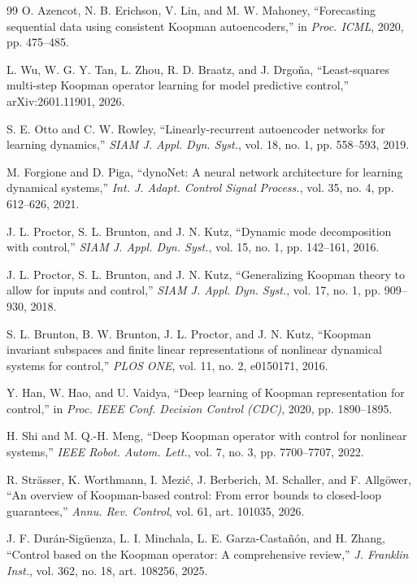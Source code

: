 \documentclass[journal]{IEEEtran}
\begin{document}
\begin{thebibliography}{99}
O. Azencot, N. B. Erichson, V. Lin, and M. W. Mahoney, ``Forecasting sequential data using consistent Koopman autoencoders,'' in \emph{Proc. ICML}, 2020, pp. 475--485.

L. Wu, W. G. Y. Tan, L. Zhou, R. D. Braatz, and J. Drgo\v{n}a, ``Least-squares multi-step Koopman operator learning for model predictive control,'' arXiv:2601.11901, 2026.

S. E. Otto and C. W. Rowley, ``Linearly-recurrent autoencoder networks for learning dynamics,'' \emph{SIAM J. Appl. Dyn. Syst.}, vol. 18, no. 1, pp. 558--593, 2019.

M. Forgione and D. Piga, ``dynoNet: A neural network architecture for learning dynamical systems,'' \emph{Int. J. Adapt. Control Signal Process.}, vol. 35, no. 4, pp. 612--626, 2021.

J. L. Proctor, S. L. Brunton, and J. N. Kutz, ``Dynamic mode decomposition with control,'' \emph{SIAM J. Appl. Dyn. Syst.}, vol. 15, no. 1, pp. 142--161, 2016.

J. L. Proctor, S. L. Brunton, and J. N. Kutz, ``Generalizing Koopman theory to allow for inputs and control,'' \emph{SIAM J. Appl. Dyn. Syst.}, vol. 17, no. 1, pp. 909--930, 2018.

S. L. Brunton, B. W. Brunton, J. L. Proctor, and J. N. Kutz, ``Koopman invariant subspaces and finite linear representations of nonlinear dynamical systems for control,'' \emph{PLOS ONE}, vol. 11, no. 2, e0150171, 2016.

Y. Han, W. Hao, and U. Vaidya, ``Deep learning of Koopman representation for control,'' in \emph{Proc. IEEE Conf. Decision Control (CDC)}, 2020, pp. 1890--1895.

H. Shi and M. Q.-H. Meng, ``Deep Koopman operator with control for nonlinear systems,'' \emph{IEEE Robot. Autom. Lett.}, vol. 7, no. 3, pp. 7700--7707, 2022.

R. Str\"asser, K. Worthmann, I. Mezi\'c, J. Berberich, M. Schaller, and F. Allg\"ower, ``An overview of Koopman-based control: From error bounds to closed-loop guarantees,'' \emph{Annu. Rev. Control}, vol. 61, art. 101035, 2026.

J. F. Dur\'an-Sig\"uenza, L. I. Minchala, L. E. Garza-Casta\~n\'on, and H. Zhang, ``Control based on the Koopman operator: A comprehensive review,'' \emph{J. Franklin Inst.}, vol. 362, no. 18, art. 108256, 2025.


\end{thebibliography}
\end{document}
